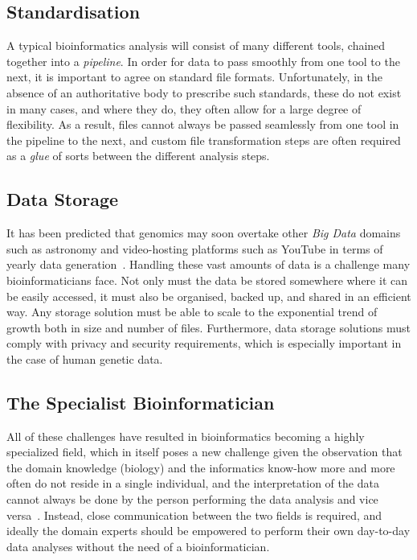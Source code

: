 \begin{justify}
\subsection{Standardisation}
A typical bioinformatics analysis will consist of many different tools, chained together into a \emph{pipeline}. In order for data to pass smoothly from one tool to the next, it is important to agree on standard file formats. Unfortunately, in the absence of an authoritative body to prescribe such standards, these do not exist in many cases, and where they do, they often allow for a large degree of flexibility. As a result, files cannot always be passed seamlessly from one tool in the pipeline to the next, and custom file transformation steps are often required as a \emph{glue} of sorts between the different analysis steps.


\subsection{Data Storage}

It has been predicted that genomics may soon overtake other \emph{Big Data} domains such as astronomy and video-hosting platforms such as YouTube in terms of yearly data generation~\cite{Stephens2015}. Handling these vast amounts of data is a challenge many bioinformaticians face. Not only must the data be stored somewhere where it can be easily accessed, it must also be organised, backed up, and shared in an efficient way. Any storage solution must be able to scale to the exponential trend of growth both in size and number of files. Furthermore, data storage solutions must comply with privacy and security requirements, which is especially important in the case of human genetic data.


\subsection{The Specialist Bioinformatician}
All of these challenges have resulted in bioinformatics becoming a highly specialized field, which in itself poses a new challenge given the observation that the domain knowledge (biology) and the informatics know-how more and more often do not reside in a single individual, and the interpretation of the data cannot always be done by the person performing the data analysis and vice versa~\cite{preeyanon2014reproducible}. Instead, close communication between the two fields is required, and ideally the domain experts should be empowered to perform their own day-to-day data analyses without the need of a bioinformatician.



\end{justify}
